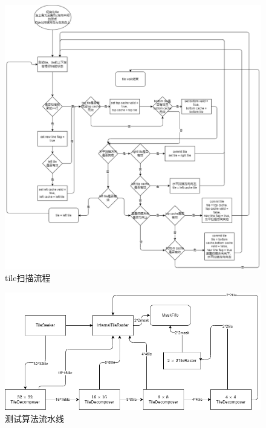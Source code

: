 {\begin{figure}[H]
        \includegraphics[width=.9\linewidth]{figure/tilewalkflow.png}
        \caption{\label{fig:tile scan flow chart}tile扫描流程}
    \end{figure}
    \begin{figure}[H]
        \centering
        \includegraphics[width=.9\linewidth]{figure/pipeline.png}
        \caption{\label{fig:alogrithm pipeline}测试算法流水线}
    \end{figure}
    

}

